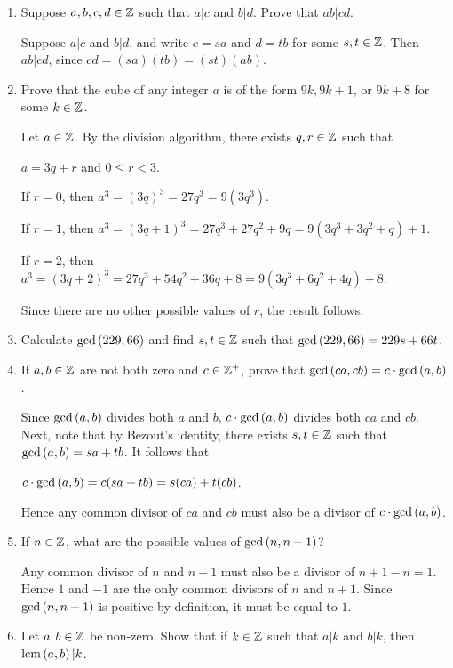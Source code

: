 \documentclass[11pt,fleqn,dvipsnames,usenames]{article}
\newcommand{\p}{\noindent}
\begin{document}
\begin{enumerate}
\item Suppose $a,b,c,d\in\mathbb{Z}$ such that $a|c$ and $b|d$.  Prove that $ab|cd$.
\vsmsp

\solution Suppose $a|c$ and $b|d$, and write $c = sa$ and $d = tb$ for some $s,t\in\mathbb{Z}$.  Then $ab|cd$, since $cd = (sa)(tb) = (st)(ab)$.

\item Prove that the cube of any integer $a$ is of the form $9k, 9k+1$, or $9k+8$ for some $k\in\mathbb{Z}$.
\vsmsp

\solution Let $a\in\mathbb{Z}$.  By the division algorithm, there exists $q,r\in\mathbb{Z}$ such that
\begin{center}
$a = 3q + r$ and $0\leq r < 3$.
\end{center}
\p If $r = 0$, then $a^3 = (3q)^3 = 27q^3 = 9(3q^3)$.
\vsmsp

\p If $r = 1$, then $a^3 = (3q + 1)^3 = 27q^3 + 27q^2 + 9q = 9(3q^3 + 3q^2 + q) + 1$.
\vsmsp

\p If $r = 2$, then $a^3 = (3q + 2)^3 = 27q^3 + 54q^2 + 36q + 8 = 9(3q^3 + 6q^2 + 4q) + 8$.
\vsmsp

\p Since there are no other possible values of $r$, the result follows.

\item Calculate $\text{gcd}\left(229,66\right)$ and find $s,t\in\mathbb{Z}$ such that $\text{gcd}\left(229,66\right) = 229s + 66t$.
\item If $a,b\in\mathbb{Z}$ are not both zero and $c\in\mathbb{Z}^{+}$, prove that $\text{gcd}\left(ca,cb\right) = c\cdot \text{gcd}\left(a,b\right)$.
\vsmsp

\solution Since $\text{gcd}\left(a,b\right)$ divides both $a$ and $b$, $c\cdot \text{gcd}\left(a,b\right)$ divides both $ca$ and $cb$.
Next, note that by Bezout's identity, there exists $s,t\in\mathbb{Z}$ such that $\text{gcd}\left(a,b\right) = sa + tb$.  It follows that
\begin{center}
$c\cdot \text{gcd}\left(a,b\right) = c(sa + tb) = s(ca) + t(cb)$.
\end{center}
Hence any common divisor of $ca$ and $cb$ must also be a divisor of $c\cdot\text{gcd}\left(a,b\right)$.

\item If $n\in \mathbb{Z}$, what are the possible values of $\text{gcd}\left(n, n+1\right)$?
\vsmsp

\solution Any common divisor of $n$ and $n+1$ must also be a divisor of $n+1 - n = 1$.  Hence $1$ and $-1$ are the only common divisors of $n$ and $n+1$.  Since $\text{gcd}\left(n,n+1\right)$ is positive by definition, it must be equal to $1$.

\item Let $a,b\in\mathbb{Z}$ be non-zero.  Show that if $k\in\mathbb{Z}$ such that $a|k$ and $b|k$, then $\text{lcm}\left(a, b\right)|k$.
\vsmsp


\end{enumerate}
\end{document}
